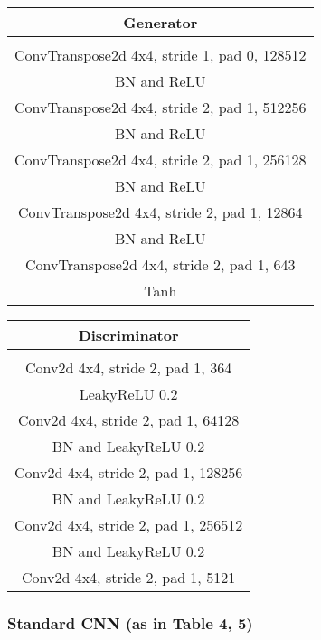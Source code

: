 \documentclass{article}
\begin{document}
\begin{center}
\begin{tabular}{c}
	Generator \\
	\toprule\midrule
	 \\
	\midrule
	ConvTranspose2d 4x4, stride 1, pad 0, 128512 \\
	\midrule
	BN and ReLU \\
	\midrule
	ConvTranspose2d 4x4, stride 2, pad 1, 512256 \\
	\midrule
	BN and ReLU \\
	\midrule
	ConvTranspose2d 4x4, stride 2, pad 1, 256128 \\
	\midrule
	BN and ReLU \\
	\midrule
	ConvTranspose2d 4x4, stride 2, pad 1, 12864 \\
	\midrule
	BN and ReLU \\
	\midrule
	ConvTranspose2d 4x4, stride 2, pad 1, 643 \\
	\midrule
	Tanh \\
	\bottomrule
\end{tabular} 
\end{center}
\begin{center}
\begin{tabular}{c}
	Discriminator \\
	\toprule\midrule
	 \\
	\midrule
	Conv2d 4x4, stride 2, pad 1, 364 \\
	\midrule
	LeakyReLU 0.2 \\
	\midrule
	Conv2d 4x4, stride 2, pad 1, 64128 \\
	\midrule
	BN and LeakyReLU 0.2 \\
	\midrule
	Conv2d 4x4, stride 2, pad 1, 128256 \\
	\midrule
	BN and LeakyReLU 0.2 \\
	\midrule
	Conv2d 4x4, stride 2, pad 1, 256512 \\
	\midrule
	BN and LeakyReLU 0.2 \\
	\midrule
	Conv2d 4x4, stride 2, pad 1, 5121 \\
	\bottomrule
\end{tabular}
\end{center}

\subsubsection{Standard CNN (as in Table 4, 5)}
\end{document}
